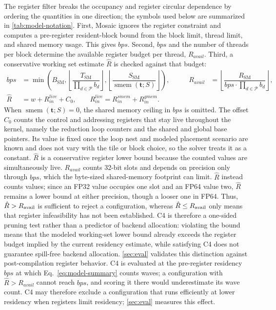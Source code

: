 \documentclass[acmsmall,review,anonymous,screen]{acmart}
\newif\ifrevmarkup %
\DeclareRobustCommand{\revRthree}[1]{\ifrevmarkup{\color{revRthree}\hypersetup{allcolors=revRthree}#1}\else#1\fi} %
\newcommand{\name}{{Mosaic}\xspace}
\newcommand{\tvec}{\mathbf{t}}
\newcommand{\work}{w}
\newcommand{\Rsm}{R_{\mathrm{SM}}}
\newcommand{\Ssm}{S_{\mathrm{SM}}}
\newcommand{\Bsm}{B_{\mathrm{SM}}}
\newcommand{\Tsm}{T_{\mathrm{SM}}}
\newcommand{\Czero}{C_0}
\providecommand{\DIFaddbegin}{} %
\providecommand{\DIFaddend}{} %
\newcommand{\DIFaddincludegraphics}[2][]{{\color{blue}\fbox{\DIFOincludegraphics[#1]{#2}}}} %
\DeclareRobustCommand{\DIFaddbegin}{\DIFOaddbegin \let\includegraphics\DIFaddincludegraphics} %
\DeclareRobustCommand{\DIFaddend}{\DIFOaddend \let\includegraphics\DIFOincludegraphics} %
\begin{document}
The register filter breaks the occupancy and register circular dependence by ordering the quantities in one direction; the symbols used below are summarized in \autoref{tab:model-notation}. First, \name ignores the register constraint and computes a pre-register resident-block bound from the block limit, thread limit, and shared memory usage. This gives \(bps\). Second, \(bps\) and the number of threads per block determine the available register budget per thread, \(R_{\mathit{avail}}\). Third, a conservative working set estimate \(\hat{R}\) is checked against that budget:
\begingroup
\renewcommand{\arraystretch}{1.12}
\begin{equation}
\begin{aligned}
bps
&= \min\left(
   \Bsm,
   \left\lfloor \dfrac{\Tsm}{\prod_{d\in\mathcal{P}} b_d} \right\rfloor,
   \left\lfloor
   \dfrac{\Ssm}{\operatorname{smem}(\tvec;S)}
   \right\rfloor
   \right),
&\qquad
R_{\mathit{avail}}
&= \left\lfloor
   \dfrac{\Rsm}{bps \cdot \prod_{d\in\mathcal{P}} b_d}
   \right\rfloor,\\[1.5ex]
\hat{R}
&= \work + R^{\mathit{live}}_{\mathit{in}} + \Czero,
\qquad
R^{\mathit{live}}_{\mathit{in}}
= R^{\mathit{smem}}_{\mathit{in}} + R^{\mathit{gmem}}_{\mathit{in}}.
\end{aligned}
\label{eq:resident-blocks}
\end{equation}
\endgroup
When \(\operatorname{smem}(\tvec;S)=0\), the shared memory ceiling in \(bps\) is omitted. The offset \(\Czero\) counts the control and addressing registers that stay live throughout the kernel, namely the reduction loop counters and the shared and global base pointers. Its value is fixed once the loop nest and modeled placement scenario are known and does not vary with the tile or block choice, so the solver treats it as a constant. \(\hat R\) is a conservative register lower bound because the counted values are simultaneously live. \DIFaddbegin \revRthree{$R_{\mathit{avail}}$ counts 32-bit slots and depends on precision only through $bps$, which the byte-sized shared-memory footprint can limit. $\hat{R}$ instead counts values; since an FP32 value occupies one slot and an FP64 value two, $\hat{R}$ remains a lower bound at either precision, though a looser one in FP64.} \DIFaddend Thus, \(\hat R > R_{\rm avail}\) is sufficient to reject a configuration, whereas \(\hat R \le R_{\rm avail}\) only means that register infeasibility has not been established. C4 is therefore a one-sided pruning test rather than a predictor of backend allocation: violating the bound means that the modeled working-set lower bound already exceeds the register budget implied by the current residency estimate, while satisfying C4 does not guarantee spill-free backend allocation. \autoref{sec:eval} validates this distinction against post-compilation register behavior. \DIFaddbegin \revRthree{C4 is evaluated at the pre-register residency $bps$ at which Eq.~\eqref{eq:model-summary} counts waves; a configuration with $\hat R > R_{\mathit{avail}}$ cannot reach $bps$, and scoring it there would underestimate its wave count. C4 may therefore exclude a configuration that runs efficiently at lower residency when registers limit residency; \autoref{sec:eval} measures this effect.}
\DIFaddend
\end{document}
